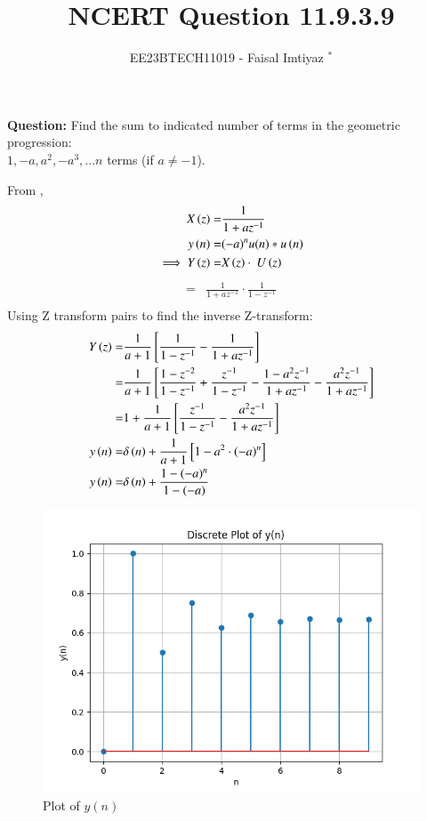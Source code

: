 \documentclass[journal,12pt,twocolumn]{IEEEtran}
\theoremstyle{remark}
\begin{document}

\vspace{3cm}
\title{NCERT Question 11.9.3.9}
\author{EE23BTECH11019 - Faisal Imtiyaz $^{*}$%
}
\maketitle
\newpage
\bigskip

\renewcommand{\thefigure}{\arabic{figure}}
\renewcommand{\thetable}{\arabic{table}}


\vspace{3cm}
\textbf{Question:} Find the sum to indicated number of terms in the geometric progression:\\
$1,-a, a^2, -a^3,...n$ terms (if $a\neq-1$).\\
\solution

\newline

From ,
\begin{align}
X\left(z\right) =& \frac{1}{1+az^{-1}}\\
y\left(n\right)= &{(-a)^n}u(n)*u\left(n\right)\\
\implies Y\left(z\right)= &X\left(z\right)\cdot\ U\left(z\right)
\end{align}
\begin{align}
    = &\frac{1}{1+az^{-1}}\cdot\frac{1}{1-z^{-1}}\\
\end{align}
Using Z transform pairs  to find the inverse Z-transform:\\
\begin{align}
    Y\left(z\right)=& \frac{1}{a+1}{}\left[\frac{1}{1-z^{-1}} - \frac{1}{1+az^{-1}}\right]\\
    =& \frac{1}{a+1}{}\left[\frac{1-z^{-2}}{1-z^{-1}}+\frac{z^{-1}}{1-z^{-1}} -\frac{{1}-a^{2}z^{-1}}{1+az^{-1}} -\frac{a^{2}z^{-1}}{1+az^{-1}}\right]\\
    =& 1+\frac{1}{a+1}{}\left[\frac{z^{-1}}{1-z^{-1}}-\frac{a^{2}z^{-1}}{1+az^{-1}}\right]\\
    y\left(n\right) =& \delta\left(n\right) + \frac{1}{a+1}{}\left[1- a^{2}\cdot(-a)^{n}\right]\\
    y\left(n\right) =& \delta\left(n\right)+ \frac{1-(-a)^{n}}{1-(-a)}
\end{align}
\begin{figure}[ht!]
	\includegraphics[width=\columnwidth]{plots/plot-file.png}
	\caption{Plot of $y(n)$}
	\label{fig:1.2}
\end{figure}
\end{document}
